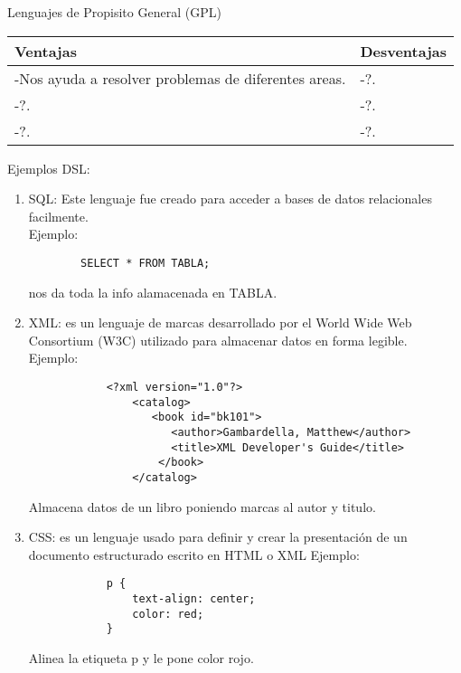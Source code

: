 \documentclass{article}
\begin{document}
\begin{center}
Lenguajes de Propisito General (GPL)
\end{center}
\begin{tabularx}{\textwidth}{X|X}
	  \textbf{Ventajas} & \textbf{Desventajas} \\
	\hline
	-Nos ayuda a resolver problemas de diferentes areas. & -?.\\
	-?. & -?.\\
	-?. & -?.\\
\end{tabularx}
\begin{center}
Ejemplos DSL:
\end{center}

\begin{enumerate}
  \item SQL: Este lenguaje fue creado para acceder a bases de datos relacionales facilmente.\\
  		Ejemplo:\\  
		\begin{verbatim}
  		SELECT * FROM TABLA; 
  		\end{verbatim}
  		nos da toda la info alamacenada en TABLA.
  \item XML: es un lenguaje de marcas desarrollado por el World Wide Web Consortium (W3C) utilizado para almacenar datos en forma legible.\\
  		Ejemplo:
  		\begin{verbatim}
	  		<?xml version="1.0"?>
				<catalog>
				   <book id="bk101">
				      <author>Gambardella, Matthew</author>
				      <title>XML Developer's Guide</title>
				    </book>
				</catalog>
		\end{verbatim}
		Almacena datos de un libro poniendo marcas al autor y titulo.
  \item CSS: es un lenguaje usado para definir y crear la presentación de un documento estructurado escrito en HTML o XML
  Ejemplo:
		\begin{verbatim}
	  		p {
			    text-align: center;
			    color: red;
			} 
		\end{verbatim}
		Alinea la etiqueta p y le pone color rojo.
\end{enumerate}
\end{document}
